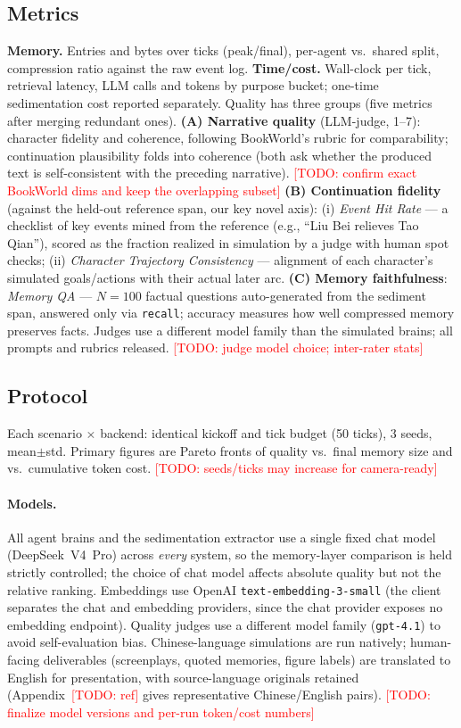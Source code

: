 \documentclass[11pt]{article}
\newcommand{\todo}[1]{\textcolor{red}{[TODO: #1]}}
\begin{document}
\subsection{Metrics}
\label{sec:metrics}
\textbf{Memory.} Entries and bytes over ticks (peak/final), per-agent vs.\
shared split, compression ratio against the raw event log.
\textbf{Time/cost.} Wall-clock per tick, retrieval latency, LLM calls and
tokens by purpose bucket; one-time sedimentation cost reported separately.
Quality has three groups (five metrics after merging redundant ones).
\textbf{(A) Narrative quality} (LLM-judge, 1--7): character fidelity and
coherence, following BookWorld's rubric for comparability; continuation
plausibility folds into coherence (both ask whether the produced text is
self-consistent with the preceding narrative). \todo{confirm exact BookWorld
dims and keep the overlapping subset}
\textbf{(B) Continuation fidelity} (against the held-out reference span, our
key novel axis): (i) \emph{Event Hit Rate} --- a checklist of key events mined
from the reference (e.g., ``Liu Bei relieves Tao Qian''), scored as the
fraction realized in simulation by a judge with human spot checks;
(ii) \emph{Character Trajectory Consistency} --- alignment of each character's
simulated goals/actions with their actual later arc.
\textbf{(C) Memory faithfulness}: \emph{Memory QA} --- $N{=}100$ factual
questions auto-generated from the sediment span, answered only via
\texttt{recall}; accuracy measures how well compressed memory preserves facts.
Judges use a different model family than the simulated brains; all prompts and
rubrics released. \todo{judge model choice; inter-rater stats}

\subsection{Protocol}
Each scenario $\times$ backend: identical kickoff and tick budget (50 ticks),
3 seeds, mean$\pm$std. Primary figures are Pareto fronts of quality vs.\ final
memory size and vs.\ cumulative token cost. \todo{seeds/ticks may increase for
camera-ready}

\paragraph{Models.} All agent brains and the sedimentation extractor use a
single fixed chat model (DeepSeek~V4~Pro) across \emph{every} system, so the
memory-layer comparison is held strictly controlled; the choice of chat model
affects absolute quality but not the relative ranking. Embeddings use OpenAI
\texttt{text-embedding-3-small} (the client separates the chat and embedding
providers, since the chat provider exposes no embedding endpoint). Quality
judges use a different model family (\texttt{gpt-4.1}) to avoid self-evaluation
bias. Chinese-language simulations are run natively; human-facing deliverables
(screenplays, quoted memories, figure labels) are translated to English for
presentation, with source-language originals retained (Appendix~\todo{ref}
gives representative Chinese/English pairs). \todo{finalize model versions and
per-run token/cost numbers}
\end{document}
